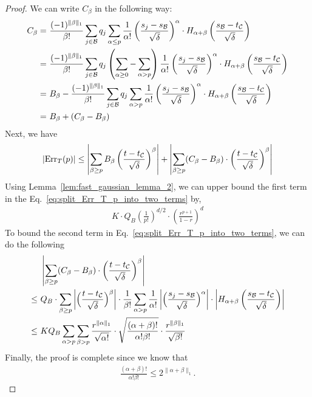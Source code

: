 \begin{proof}

We can write $C_{\beta}$ in the following way:
\begin{align*}
C_{\beta} = & ~ \frac{ (-1)^{ \| \beta \|_1 } }{ \beta ! } \sum_{j \in {\cal B}} q_j \sum_{\alpha \leq p} \frac{1}{ \alpha ! } \left( \frac{ s_j - s_{\cal B} }{ \sqrt{\delta} } \right)^{\alpha} \cdot H_{\alpha + \beta} \left( \frac{ s_{\cal B} - t_{\cal C} }{ \sqrt{\delta} } \right) \\
= & ~ \frac{ (-1)^{\| \beta \|_1} }{ \beta ! } \sum_{j \in {\cal B}} q_j \left( \sum_{\alpha \geq 0} - \sum_{\alpha > p} \right) \frac{1}{ \alpha ! } \left( \frac{ s_j - s_{\cal B} }{ \sqrt{\delta} } \right)^{\alpha} \cdot H_{\alpha + \beta} \left( \frac{ s_{\cal B} - t_{\cal C} }{ \sqrt{\delta} } \right) \\
= & ~ B_{\beta} - \frac{ (-1)^{ \| \beta \|_1 } }{ \beta ! } \sum_{j \in {\cal B}} q_j \sum_{\alpha > p} \frac{1}{ \alpha ! } \left( \frac{ s_j - s_{\cal B} }{ \sqrt{\delta} } \right)^{\alpha} \cdot H_{\alpha + \beta} \left( \frac{ s_{\cal B} - t_{\cal C} }{ \sqrt{\delta} } \right) \\
= & ~ B_{\beta} + (C_{\beta} - B_{\beta})
\end{align*}
Next, we have
\begin{align}\label{eq:split_Err_T_p_into_two_terms}
| \mathrm{Err}_T(p) | \leq \left| \sum_{\beta \geq p} B_{\beta} \left( \frac{ t - t_{\cal C} }{ \sqrt{\delta} } \right)^{\beta} \right| + \left| \sum_{\beta \geq p} (C_{\beta} - B_{\beta}) \cdot \left( \frac{ t - t_{\cal C} }{ \sqrt{\delta} } \right)^{\beta} \right|
\end{align}
Using Lemma~\ref{lem:fast_gaussian_lemma_2}, we can upper bound the first term in the Eq.~\eqref{eq:split_Err_T_p_into_two_terms} by,
\begin{align*}
K \cdot Q_B \left( \frac{1}{ p ! } \right)^{d/2} \cdot \left( \frac{ r^{p+1} }{1-r} \right)^d
\end{align*}
To bound the second term in Eq.~\eqref{eq:split_Err_T_p_into_two_terms}, we can do the following
\begin{align*}
 & ~ \left| \sum_{\beta \geq p} (C_{\beta} - B_{\beta}) \cdot \left( \frac{ t - t_{\cal C} }{ \sqrt{\delta} } \right)^{\beta} \right| \\
\leq & ~ Q_B \cdot \sum_{\beta \geq p} \left| \Big( \frac{ t - t_{\cal C} }{ \sqrt{\delta} } \Big)^{\beta} \right| \cdot \frac{1}{\beta !} \sum_{\alpha > p} \frac{1}{\alpha !} \left| \Big( \frac{ s_j - s_{\cal B} }{ \sqrt{\delta} } \Big)^{\alpha} \right| \cdot \left| H_{\alpha + \beta} \left( \frac{s_{\cal B} -  t_{\cal C} } { \sqrt{\delta} } \right) \right| \\
\leq & ~ K Q_{B} \sum_{\alpha > p} \sum_{\beta > p} \frac{ r^{\| \alpha \|_1 } }{  \sqrt{ \alpha ! }} \cdot \sqrt{ \frac{ (\alpha +\beta) ! }{ \alpha ! \beta ! } } \cdot \frac{ r^{\| \beta \|_1 } }{  \sqrt{ \beta ! }}
\end{align*}
Finally, the proof is complete since we know that
\begin{align*}
\frac{ (\alpha + \beta) ! }{  \alpha ! \beta ! } \leq 2^{ \| \alpha + \beta \|_1 }.
\end{align*}
\end{proof}

